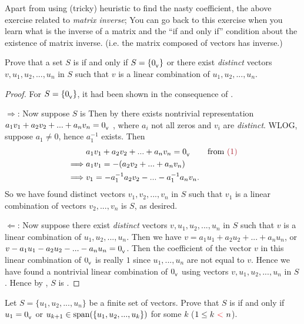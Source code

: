 \begin{note}
\TODOREF{} Apart from using (tricky) heuristic to find the nasty coefficient,
the above exercise related to \emph{matrix inverse};
You can go back to this exercise when you learn what is the inverse of a matrix and the ``if and only if'' condition about the existence of matrix inverse. (i.e. the matrix composed of \LID{} vectors has inverse.)
\end{note}

\begin{exercise} \label{exercise 1.5.14}
Prove that a set \(S\) is \LDP{} if and only if \(S = \{ 0_{_{\textsf{V}}} \}\) or there exist \emph{distinct} vectors \(v, u_1, u_2, ..., u_n\) in \(S\) such that \(v\) is a linear combination of \(u_1, u_2, ..., u_n\).
\end{exercise}

\begin{proof}
For \(S = \{ 0_{_{\textsf{V}}} \}\), it had been shown in the consequence of .

\(\Longrightarrow\):
Now suppose \(S\) is \LDP{}
Then by  there exists nontrivial representation \(a_1 v_1 + a_2 v_2 + ... + a_n v_n = 0_{_{\textsf{V}}}\) , where \(a_i\) not all zeros and \(v_i\) are \emph{distinct}.
WLOG, suppose \(a_1 \ne 0\), hence \(a_1^{-1}\) exists.
Then
\begin{align*}
             & a_1 v_1 + a_2 v_2 + ... + a_n v_n = \OV & \text{from \MAROON{(1)}} \\
    \implies & a_1 v_1 = -(a_2 v_2 + ... + a_n v_n) \\
    \implies & v_1 = -a_1^{-1} a_2 v_2 - ... - a_1^{-1} a_n v_n.
\end{align*}
So we have found distinct vectors \(v_1, v_2, ..., v_n\) in \(S\) such that \(v_1\) is a linear combination of vectors \(v_2, ..., v_n\) is \(S\), as desired.

\(\Longleftarrow\):
Now suppose there exist \emph{distinct} vectors \(v, u_1, u_2, ..., u_n\) in \(S\) such that \(v\) is a linear combination of \(u_1, u_2, ..., u_n\).
Then we have \(v = a_1 u_1 + a_2 u_2 + ... + a_n u_n\), or \(v - a_1 u_1 - a_2 u_2 - ... - a_n u_n = 0_{_{\textsf{V}}}\).
Then the coefficient of the vector \(v\) in this linear combination of \(0_{_{\textsf{V}}}\) is really \(1\) since \(u_1, ..., u_n\) are not equal to \(v\).
Hence we have found a nontrivial linear combination of \(0_{_{\textsf{V}}}\) using vectors \(v, u_1, u_2, ..., u_n\) in \(S\).
Hence by , \(S\) is \LDP{}.
\end{proof}

\begin{exercise} \label{exercise 1.5.15}
Let \(S = \{ u_1, u_2, ..., u_n \}\) be a finite set of vectors.
Prove that \(S\) is \LDP{} if and only if \(u_1 = 0_{_{\textsf{V}}}\) or \(u_{k + 1} \in \operatorname{span}(\{ u_1, u_2, ..., u_k \})\)
for some \(k\) (\(1 \le k\ \RED{<}\ n\)).
\end{exercise}

